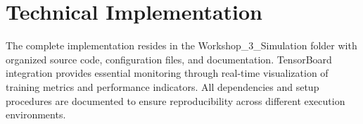 \documentclass[12pt,a4paper]{article}
\begin{document}
\appendix

\section{Technical Implementation}

The complete implementation resides in the Workshop\_3\_Simulation folder with organized source code, configuration files, and documentation. TensorBoard integration provides essential monitoring through real-time visualization of training metrics and performance indicators. All dependencies and setup procedures are documented to ensure reproducibility across different execution environments.
\end{document}
